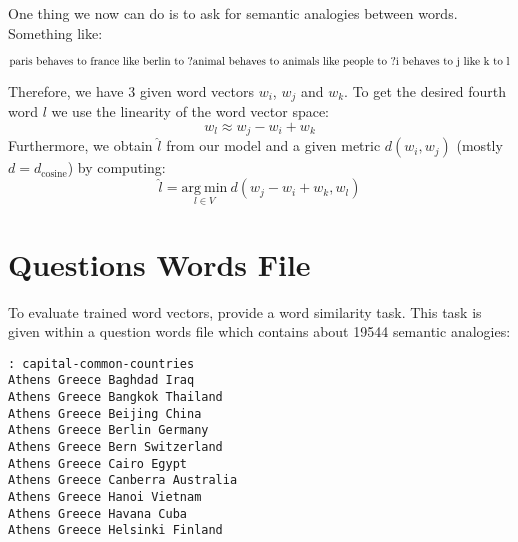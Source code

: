 One thing we now can do is to ask for semantic analogies between words. 
Something like:

\[
\mathrm{paris\ behaves\ to\ france\ like\ berlin\ to\ ?} \\
\mathrm{animal\ behaves\ to\ animals\ like\ people\ to\ ?} \\
\mathrm{i\ behaves\ to\ j\ like\ k\ to\ l} 
\]

Therefore, we have $3$ given word vectors $w_i$, $w_j$ and $w_k$. To get the 
desired fourth word $l$ we use the linearity of the word vector space:
\[
w_l \approx w_j - w_i + w_k
\]
Furthermore, we obtain $\widehat{l}$ from our model and a given metric 
$d(w_i, w_j)$ (mostly $d = d_\mathrm{cosine}$) by computing:
\[
\widehat{l} = \underset{l \in V}{\mathrm{arg~min}}\ d(w_j - w_i + w_k, w_l)
\]


\section{Questions Words File}

To evaluate trained word vectors, \cite{mikolov2013efficient} provide a word
similarity task. This task is given within a question words file which
contains about 19544 semantic analogies:

\begin{Shaded}
\begin{verbatim}
: capital-common-countries
Athens Greece Baghdad Iraq
Athens Greece Bangkok Thailand
Athens Greece Beijing China
Athens Greece Berlin Germany
Athens Greece Bern Switzerland
Athens Greece Cairo Egypt
Athens Greece Canberra Australia
Athens Greece Hanoi Vietnam
Athens Greece Havana Cuba
Athens Greece Helsinki Finland
\end{verbatim}
\end{Shaded}

